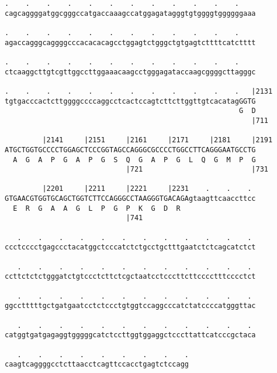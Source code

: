\documentclass{article}
\begin{document}
\begin{Verbatim}
.    .    .    .    .    .    .    .    .    .    .    .    
cagcaggggatggcgggccatgaccaaagccatggagatagggtgtggggtggggggaaa
                                                            
.    .    .    .    .    .    .    .    .    .    .    .    
agaccagggcaggggcccacacacagcctggagtctgggctgtgagtcttttcatctttt
                                                            
.    .    .    .    .    .    .    .    .    .    .    .    
ctcaaggcttgtcgttggccttggaaacaagcctgggagataccaagcggggcttagggc
                                                            
.    .    .    .    .    .    .    .    .    .    .    .   |2131
tgtgacccactcttggggccccaggcctcactccagtcttcttggttgtcacatagGGTG
                                                        G  D
                                                           |711
  
         |2141     |2151     |2161     |2171     |2181     |2191
ATGCTGGTGCCCCTGGAGCTCCCGGTAGCCAGGGCGCCCCTGGCCTTCAGGGAATGCCTG
  A  G  A  P  G  A  P  G  S  Q  G  A  P  G  L  Q  G  M  P  G
                             |721                          |731
  
         |2201     |2211     |2221     |2231    .    .    . 
GTGAACGTGGTGCAGCTGGTCTTCCAGGGCCTAAGGGTGACAGAgtaagttcaaccttcc
  E  R  G  A  A  G  L  P  G  P  K  G  D  R                  
                             |741                           
  
   .    .    .    .    .    .    .    .    .    .    .    . 
ccctcccctgagccctacatggctcccatctctgcctgctttgaatctctcagcatctct
                                                            
   .    .    .    .    .    .    .    .    .    .    .    . 
ccttctctctgggatctgtccctcttctcgctaatcctcccttcttcccctttcccctct
                                                            
   .    .    .    .    .    .    .    .    .    .    .    . 
ggcctttttgctgatgaatcctctccctgtggtccaggcccatctatccccatgggttac
                                                            
   .    .    .    .    .    .    .    .    .    .    .    . 
catggtgatgagaggtgggggcatctccttggtggaggctcccttattcatcccgctaca
                                                            
   .    .    .    .    .    .    .    .    .
caagtcaggggcctcttaacctcagttccacctgagtctccagg
                                            

\end{Verbatim}
\end{document}

